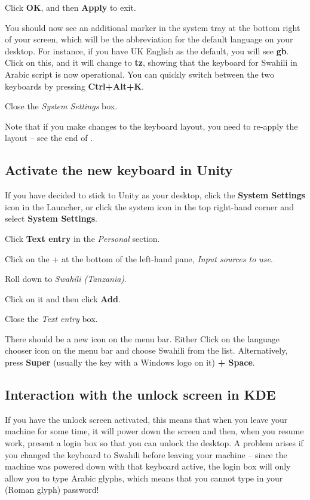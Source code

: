 Click \textbf{OK}, and then \textbf{Apply} to exit.

You should now see an additional marker in the system tray at the bottom right of your screen, which will be the abbreviation for the default language on your desktop.  For instance, if you have UK English as the default, you will see \textbf{gb}.  Click on this, and it will change to \textbf{tz}, showing that the keyboard for Swahili in Arabic script is now operational.  You can quickly switch between the two keyboards by pressing \textbf{Ctrl+Alt+K}.

Close the \textit{System Settings} box.

Note that if you make changes to the keyboard layout, you need to re-apply the layout -- see the end of .

\subsection{Activate the new keyboard in Unity}

If you have decided to stick to Unity as your desktop, click the \textbf{System Settings} icon in the Launcher, or click the system icon in the top right-hand corner and select \textbf{System Settings}.

Click \textbf{Text entry} in the \textit{Personal} section.

Click on the + at the bottom of the left-hand pane, \textit{Input sources to use}.

Roll down to \textit{Swahili (Tanzania)}.

Click on it and then click \textbf{Add}.

Close the \textit{Text entry} box.

There should be a new icon on the menu bar.  Either Click on the language chooser icon on the menu bar and choose Swahili from the list.  Alternatively, press \textbf{Super} (usually the key with a Windows logo on it) \textbf{+ Space}.

\subsection{Interaction with the unlock screen in KDE}

If you have the unlock screen activated, this means that when you leave your machine for some time, it will power down the screen and then, when you resume work, present a login box so that you can unlock the desktop.   A problem arises if you changed the  keyboard to Swahili before leaving your machine -- since the machine was powered down with that keyboard active, the login box will only allow you to type Arabic glyphs, which means that you cannot type in your (Roman glyph) password!

